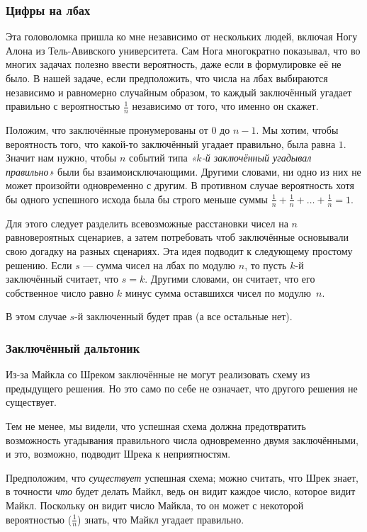 \subsubsection*{Цифры на лбах}

Эта головоломка пришла ко мне независимо от нескольких людей, включая Ногу Алона из Тель-Авивского университета.
Сам Нога многократно показывал, что во многих задачах полезно ввести вероятность, даже если в формулировке её не было.
В нашей задаче, если предположить, что числа на лбах выбираются независимо и равномерно случайным образом, то каждый заключённый угадает правильно с вероятностью $\tfrac1n$ независимо от того, что именно он скажет.

Положим, что заключённые пронумерованы от $0$ до $n-1$.
Мы хотим, чтобы вероятность того, что какой-то заключённый угадает правильно, была равна $1$.
Значит нам нужно, чтобы $n$ событий типа \emph{«$k$-й заключённый угадывал правильно»} были бы взаимоисключающими.
Другими словами, ни одно из них не может произойти одновременно с другим.
В противном случае вероятность хотя бы одного успешного исхода была бы строго меньше суммы $\tfrac1n + \tfrac1n + \dots + \tfrac1n = 1$.

Для этого следует разделить всевозможные расстановки чисел на $n$ равновероятных сценариев, а затем потребовать чтоб заключённые основывали свою догадку на разных сценариях.
Эта идея подводит к следующему простому решению.
Если $s$ --- сумма чисел на лбах по модулю $n$, то пусть $k$-й заключённый считает, что $s = k$.
Другими словами, он считает, что его собственное число равно $k$ минус сумма оставшихся чисел по модулю~$n$.

В этом случае $s$-й заключенный будет прав (а все остальные нет).

\subsubsection*{Заключённый дальтоник}

Из-за Майкла со Шреком заключённые не могут реализовать схему из предыдущего решения.
Но это само по себе не означает, что другого решения не существует.

Тем не менее, мы видели, что успешная схема должна предотвратить возможность угадывания правильного числа одновременно двумя заключёнными, и это, возможно, подводит Шрека к неприятностям.

Предположим, что \emph{существует} успешная схема; можно считать, что Шрек знает, в точности \emph{что} будет делать Майкл,
ведь он видит каждое число, которое видит Майкл.
Поскольку он видит число Майкла, то он может с некоторой вероятностью ($\tfrac1n$) знать, что Майкл угадает правильно.

